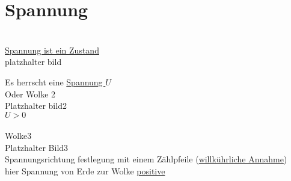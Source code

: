 \section{Spannung}
\\

\underline{Spannung ist ein Zustand}\\

platzhalter bild

Es herrscht eine \underline{Spannung $U$}\\
Oder Wolke 2
\\
Platzhalter bild2\\
$ U > 0 $\\
\\

Wolke3\\
Platzhalter Bild3\\

Spannungsrichtung festlegung mit einem Zählpfeile (\underline{willkührliche Annahme})\\
hier Spannung von Erde zur Wolke \underline{positive}\\

